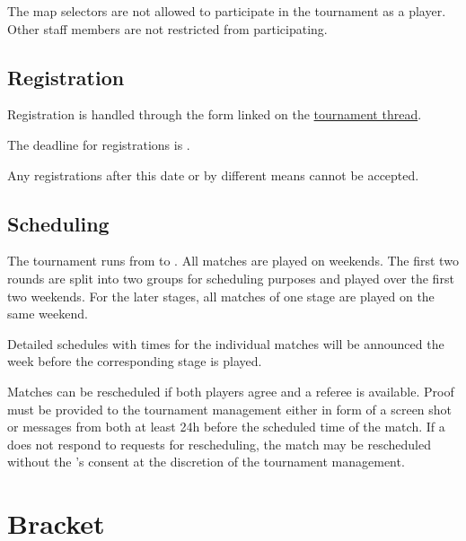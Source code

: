 The map selectors are not allowed to participate in the tournament as a player. Other staff members are not restricted from participating.

\subsection{Registration}

Registration is handled through the form linked on the \href{\thread}{tournament thread}.

The deadline for registrations is \regend.

Any registrations after this date or by different means cannot be accepted.

\subsection{Scheduling}

The tournament runs from \tournamentstart{} to \tournamentend. All matches are played on weekends. The first two rounds are split into two groups for scheduling purposes and played over the first two weekends. For the later stages, all matches of one stage are played on the same weekend.

Detailed schedules with times for the individual matches will be announced the week before the corresponding stage is played.

Matches can be rescheduled if both players agree and a referee is available. Proof must be provided to the tournament management either in form of a screen shot or messages from both  at least 24h before the scheduled time of the match. If a  does not respond to requests for rescheduling, the match may be rescheduled without the 's consent at the discretion of the tournament management.

\section{Bracket}


